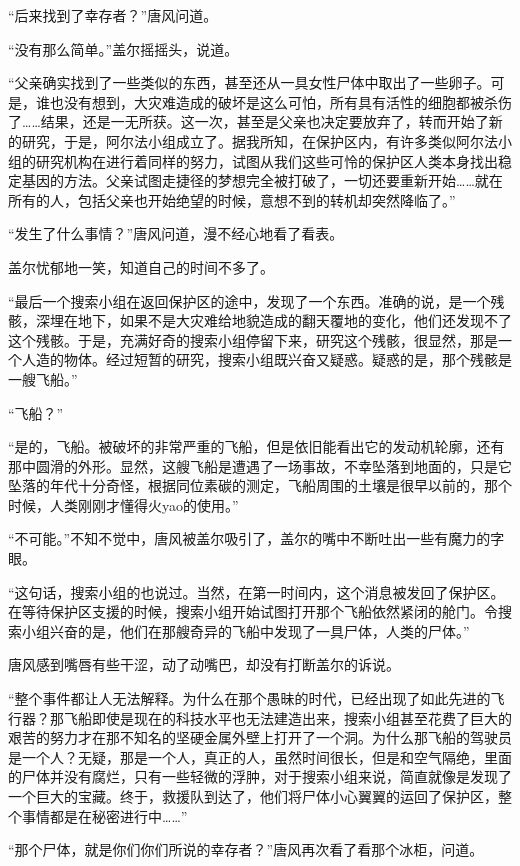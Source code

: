 “后来找到了幸存者？”唐风问道。

“没有那么简单。”盖尔摇摇头，说道。

“父亲确实找到了一些类似的东西，甚至还从一具女性尸体中取出了一些卵子。可是，谁也没有想到，大灾难造成的破坏是这么可怕，所有具有活性的细胞都被杀伤了……结果，还是一无所获。这一次，甚至是父亲也决定要放弃了，转而开始了新的研究，于是，阿尔法小组成立了。据我所知，在保护区内，有许多类似阿尔法小组的研究机构在进行着同样的努力，试图从我们这些可怜的保护区人类本身找出稳定基因的方法。父亲试图走捷径的梦想完全被打破了，一切还要重新开始……就在所有的人，包括父亲也开始绝望的时候，意想不到的转机却突然降临了。”

“发生了什么事情？”唐风问道，漫不经心地看了看表。

盖尔忧郁地一笑，知道自己的时间不多了。

“最后一个搜索小组在返回保护区的途中，发现了一个东西。准确的说，是一个残骸，深埋在地下，如果不是大灾难给地貌造成的翻天覆地的变化，他们还发现不了这个残骸。于是，充满好奇的搜索小组停留下来，研究这个残骸，很显然，那是一个人造的物体。经过短暂的研究，搜索小组既兴奋又疑惑。疑惑的是，那个残骸是一艘飞船。”

“飞船？”

“是的，飞船。被破坏的非常严重的飞船，但是依旧能看出它的发动机轮廓，还有那中圆滑的外形。显然，这艘飞船是遭遇了一场事故，不幸坠落到地面的，只是它坠落的年代十分奇怪，根据同位素碳的测定，飞船周围的土壤是很早以前的，那个时候，人类刚刚才懂得火yao的使用。”

“不可能。”不知不觉中，唐风被盖尔吸引了，盖尔的嘴中不断吐出一些有魔力的字眼。

“这句话，搜索小组的也说过。当然，在第一时间内，这个消息被发回了保护区。在等待保护区支援的时候，搜索小组开始试图打开那个飞船依然紧闭的舱门。令搜索小组兴奋的是，他们在那艘奇异的飞船中发现了一具尸体，人类的尸体。”

唐风感到嘴唇有些干涩，动了动嘴巴，却没有打断盖尔的诉说。

“整个事件都让人无法解释。为什么在那个愚昧的时代，已经出现了如此先进的飞行器？那飞船即使是现在的科技水平也无法建造出来，搜索小组甚至花费了巨大的艰苦的努力才在那不知名的坚硬金属外壁上打开了一个洞。为什么那飞船的驾驶员是一个人？无疑，那是一个人，真正的人，虽然时间很长，但是和空气隔绝，里面的尸体并没有腐烂，只有一些轻微的浮肿，对于搜索小组来说，简直就像是发现了一个巨大的宝藏。终于，救援队到达了，他们将尸体小心翼翼的运回了保护区，整个事情都是在秘密进行中……”

“那个尸体，就是你们你们所说的幸存者？”唐风再次看了看那个冰柜，问道。

